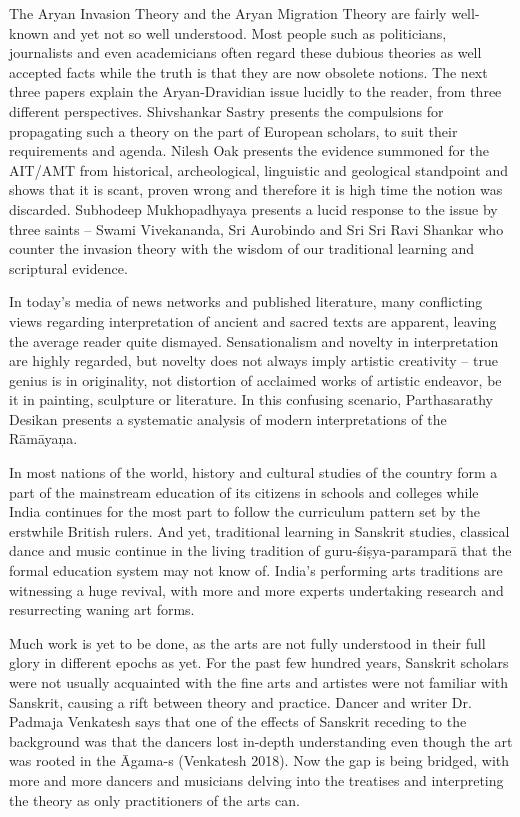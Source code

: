 The Aryan Invasion Theory and the Aryan Migration Theory are fairly well-known and yet not so well understood. Most people such as politicians, journalists and even academicians often regard these dubious theories as well accepted facts while the truth is that they are now obsolete notions. The next three papers explain the Aryan-Dravidian issue lucidly to the reader, from three different perspectives. Shivshankar Sastry presents the compulsions for propagating such a theory on the part of European scholars, to suit their requirements and agenda. Nilesh Oak presents the evidence summoned for the AIT/AMT from historical, archeological, linguistic and geological standpoint and shows that it is scant, proven wrong and therefore it is high time the notion was discarded. Subhodeep Mukhopadhyaya presents a lucid response to the issue by three saints – Swami Vivekananda, Sri Aurobindo and Sri Sri Ravi Shankar who counter the invasion theory with the wisdom of our traditional learning and scriptural evidence.

In today’s media of news networks and published literature, many conflicting views regarding interpretation of ancient and sacred texts are apparent, leaving the average reader quite dismayed. Sensationalism and novelty in interpretation are highly regarded, but novelty does not always imply artistic creativity – true genius is in originality, not distortion of acclaimed works of artistic endeavor, be it in painting, sculpture or literature. In this confusing scenario, Parthasarathy Desikan presents a systematic analysis of modern interpretations of the Rāmāyaņa.

In most nations of the world, history and cultural studies of the country form a part of the mainstream education of its citizens in schools and colleges while India continues for the most part to follow the curriculum pattern set by the erstwhile British rulers. And yet, traditional learning in Sanskrit studies, classical dance and music continue in the living tradition of guru-śiṣya-paramparā that the formal education system may not know of. India’s performing arts traditions are witnessing a huge revival, with more and more experts undertaking research and resurrecting waning art forms.

Much work is yet to be done, as the arts are not fully understood in their full glory in different epochs as yet. For the past few hundred years, Sanskrit scholars were not usually acquainted with the fine arts and artistes were not familiar with Sanskrit, causing a rift between theory and practice. Dancer and writer Dr. Padmaja Venkatesh says that one of the effects of Sanskrit receding to the background was that the dancers lost in-depth understanding even though the art was rooted in the Āgama-s (Venkatesh 2018). Now the gap is being bridged, with more and more dancers and musicians delving into the treatises and interpreting the theory as only practitioners of the arts can.

